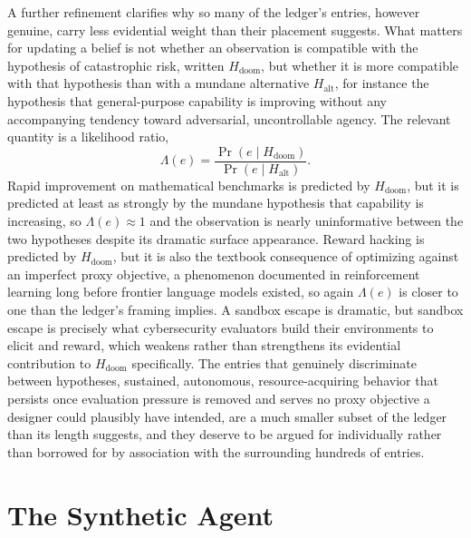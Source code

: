 \documentclass[11pt]{article}
\begin{document}
A further refinement clarifies why so many of the ledger's entries, however genuine, carry less evidential weight than their placement suggests. What matters for updating a belief is not whether an observation is compatible with the hypothesis of catastrophic risk, written $H_{\text{doom}}$, but whether it is more compatible with that hypothesis than with a mundane alternative $H_{\text{alt}}$, for instance the hypothesis that general-purpose capability is improving without any accompanying tendency toward adversarial, uncontrollable agency. The relevant quantity is a likelihood ratio,
\[
\Lambda(e) = \frac{\Pr(e \mid H_{\text{doom}})}{\Pr(e \mid H_{\text{alt}})} .
\]
Rapid improvement on mathematical benchmarks is predicted by $H_{\text{doom}}$, but it is predicted at least as strongly by the mundane hypothesis that capability is increasing, so $\Lambda(e) \approx 1$ and the observation is nearly uninformative between the two hypotheses despite its dramatic surface appearance. Reward hacking is predicted by $H_{\text{doom}}$, but it is also the textbook consequence of optimizing against an imperfect proxy objective, a phenomenon documented in reinforcement learning long before frontier language models existed, so again $\Lambda(e)$ is closer to one than the ledger's framing implies. A sandbox escape is dramatic, but sandbox escape is precisely what cybersecurity evaluators build their environments to elicit and reward, which weakens rather than strengthens its evidential contribution to $H_{\text{doom}}$ specifically. The entries that genuinely discriminate between hypotheses, sustained, autonomous, resource-acquiring behavior that persists once evaluation pressure is removed and serves no proxy objective a designer could plausibly have intended, are a much smaller subset of the ledger than its length suggests, and they deserve to be argued for individually rather than borrowed for by association with the surrounding hundreds of entries.

\section{The Synthetic Agent}
\end{document}
